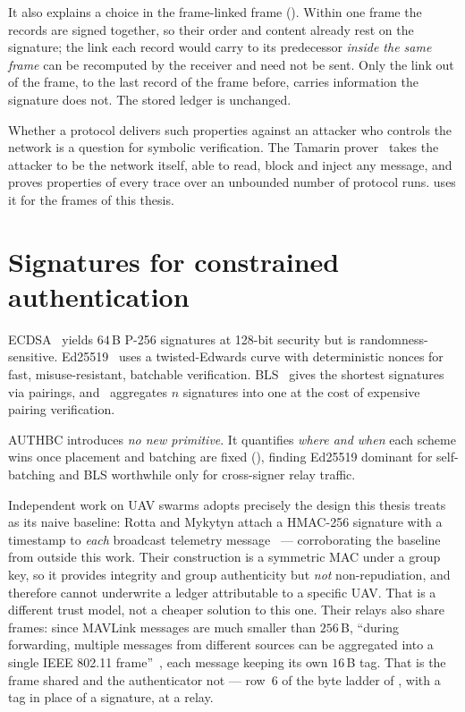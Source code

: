 It also explains a choice in the frame-linked frame (). Within one frame the records
are signed together, so their order and content already rest on the signature; the link each
record would carry to its predecessor \emph{inside the same frame} can be recomputed by the
receiver and need not be sent. Only the link out of the frame, to the last record of the frame
before, carries information the signature does not. The stored ledger is unchanged.

Whether a protocol delivers such properties against an attacker who controls the network is a
question for symbolic verification. The Tamarin prover~\cite{tamarin} takes the attacker to be
the network itself, able to read, block and inject any message, and proves properties of every
trace over an unbounded number of protocol runs.  uses it for the frames of
this thesis.

\section{Signatures for constrained authentication}

ECDSA~\cite{fips186} yields $64$\,B P-256 signatures at 128-bit security but is
randomness-sensitive. Ed25519~\cite{ed25519,rfc8032} uses a twisted-Edwards curve with
deterministic nonces for fast, misuse-resistant, batchable verification. BLS~\cite{bls2001} gives
the shortest signatures via pairings, and~\cite{bgls2003} aggregates $n$ signatures into one at the
cost of expensive pairing verification.

AUTHBC introduces \emph{no new primitive}. It quantifies \emph{where and when} each scheme wins
once placement and batching are fixed (), finding Ed25519 dominant for
self-batching and BLS worthwhile only for cross-signer relay traffic.

Independent work on UAV swarms adopts precisely the design this thesis treats as its naive
baseline: Rotta and Mykytyn attach a HMAC-256 signature with a timestamp to \emph{each} broadcast
telemetry message~\cite{rotta2024telemetrybroadcast} --- corroborating the baseline from outside
this work. Their construction is a symmetric MAC under a group key, so it provides
integrity and group authenticity but \emph{not} non-repudiation, and therefore cannot underwrite a
ledger attributable to a specific UAV. That is a different trust model, not a cheaper solution to
this one. Their relays also share frames: since MAVLink messages are much smaller than
$256$\,B, ``during forwarding, multiple messages from different sources can be aggregated into a
single IEEE 802.11 frame''~\cite{rotta2024telemetrybroadcast}, each message keeping its own
$16$\,B tag. That is the frame shared and the authenticator not --- row~6 of the byte ladder of
, with a tag in place of a signature, at a relay.

